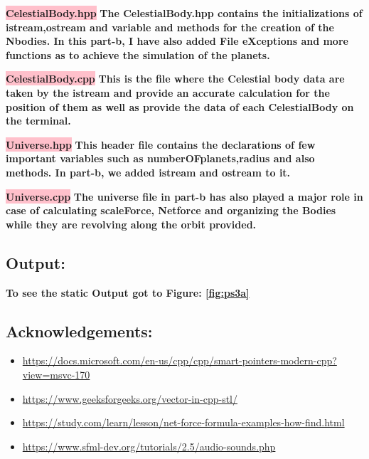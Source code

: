 \textbf{\colorbox{pink}{CelestialBody.hpp}} \newline \textbf{The CelestialBody.hpp contains the initializations of istream,ostream and variable and methods for the creation of the Nbodies. In this part-b, I have also added File eXceptions and more functions as to achieve the simulation of the planets.}


\textbf{\colorbox{pink}{CelestialBody.cpp}} \newline \textbf{This is the file where the Celestial body data are taken by the istream and provide an accurate calculation for the position of them as well as provide the data of each CelestialBody on the terminal.}


\textbf{\colorbox{pink}{Universe.hpp}} \newline \textbf{This header file contains the declarations of few important variables such as numberOFplanets,radius and also methods. In part-b, we added istream and ostream to it.}



\textbf{\colorbox{pink}{Universe.cpp}} \newline \textbf{The universe file in part-b has also played a major role in case of calculating scaleForce, Netforce and organizing the Bodies while they are revolving along the orbit provided.}



\subsection{Output:}
\textbf{To see the static Output got to Figure: \ref{fig:ps3a}}

\subsection{Acknowledgements:}
\begin{itemize}
    \item  \url{ https://docs.microsoft.com/en-us/cpp/cpp/smart-pointers-modern-cpp?view=msvc-170}
  \item \url{https://www.geeksforgeeks.org/vector-in-cpp-stl/}
  \item \url{https://study.com/learn/lesson/net-force-formula-examples-how-find.html}
  \item \url{https://www.sfml-dev.org/tutorials/2.5/audio-sounds.php}
\end{itemize}
\newpage
